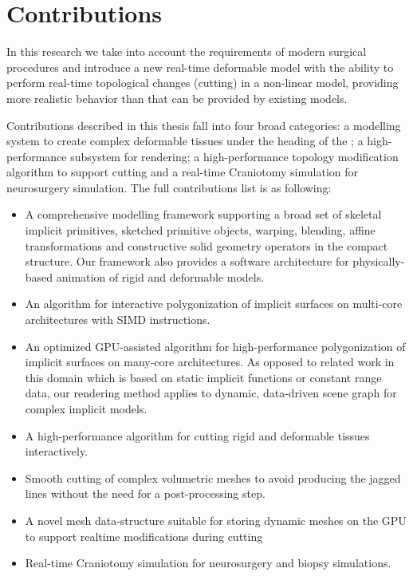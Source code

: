 \section{Contributions}
\label{sec:contributions}
In this research we take into account the requirements of modern surgical procedures and introduce a 
new real-time deformable model with the ability to perform real-time topological changes (cutting) in a 
non-linear model, providing more realistic behavior than that can be provided by existing models. 

Contributions described in this thesis fall into four broad categories: a modelling system to create 
complex deformable tissues under the heading of the \blob; a high-performance subsystem for 
rendering; a high-performance topology modification algorithm to support cutting and a  
real-time Craniotomy simulation for neurosurgery simulation. The full contributions list is as 
following:

\begin{itemize}
 \item A comprehensive modelling framework supporting a broad set of skeletal implicit primitives, 
 sketched primitive objects, warping, blending, affine transformations and constructive solid geometry 
 operators in the compact \blob structure. Our framework also provides a software architecture for 
 physically-based animation of rigid and deformable models.
 
 \item An algorithm for interactive polygonization of implicit surfaces on multi-core architectures with 
 SIMD instructions. %
 
 \item An optimized GPU-assisted algorithm for high-performance polygonization of implicit surfaces 
 on many-core architectures. As opposed to related work in this domain which is based on static implicit
 functions or constant range data, our rendering method applies to dynamic, data-driven \blob scene graph
 for complex implicit models. 
  
 \item A high-performance algorithm for cutting rigid and deformable tissues interactively. 
 
 \item Smooth cutting of complex volumetric meshes to avoid producing the jagged lines without the 
 need for a post-processing step.

 \item A novel mesh data-structure suitable for storing dynamic meshes on the GPU to support realtime 
 modifications during cutting
 
\item Real-time Craniotomy simulation for neurosurgery and biopsy simulations.

\end{itemize}


